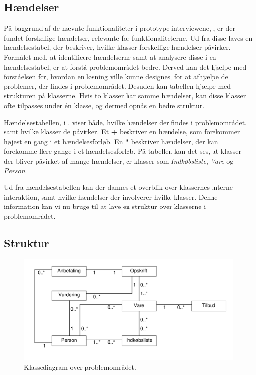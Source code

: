 \subsection{Hændelser}\label{handelser}
På baggrund af de nævnte funktionaliteter i prototype interviewene, , er der fundet forskellige hændelser, relevante for funktionaliteterne.
Ud fra disse laves en hændelsestabel, der beskriver, hvilke klasser forskellige hændelser påvirker.
Formålet med, at identificere hændelserne samt at analysere disse i en hændelsestabel, er at forstå problemområdet bedre.
Derved kan det hjælpe med forståelsen for, hvordan en løsning ville kunne designes, for at afhjælpe de problemer, der findes i problemområdet. 
Desuden kan tabellen hjælpe med strukturen på klasserne.
Hvis to klasser har samme hændelser, kan disse klasser ofte tilpasses under én klasse, og dermed opnås en bedre struktur.



Hændelsestabellen, i , viser både, hvilke hændelser der findes i problemområdet, samt hvilke klasser de påvirker.
Et \textbf{+} beskriver en hændelse, som forekommer højest en gang i et hændelsesforløb.
En \textbf{*} beskriver hændelser, der kan forekomme flere gange i et hændelsesforløb.\citep{OOA&D2001}
På tabellen kan det ses, at klasser der bliver påvirket af mange hændelser, er klasser som \textit{Indkøbsliste}, \textit{Vare} og \textit{Person}.

Ud fra hændelsestabellen kan der dannes et overblik over klassernes interne interaktion, samt hvilke hændelser der involverer hvilke klasser.
Denne information kan vi nu bruge til at lave en struktur over klasserne i problemområdet.

\newpage
\subsection{Struktur}\label{sec:struktur}
\begin{figure}[h]
	\centering
		\includegraphics[scale=0.6]{images/Diagrams/klassediagram_model_simple.pdf}
	\caption{Klassediagram over problemområdet.}\label{figur:PDklasse}
\end{figure}

